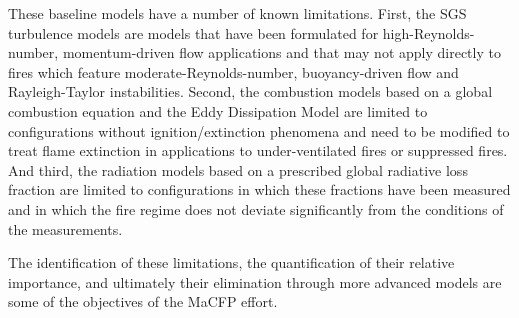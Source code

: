 These baseline models have a number of known limitations. First, the SGS turbulence models are models that have been formulated for high-Reynolds-number, momentum-driven flow applications and that may not apply directly to fires which feature moderate-Reynolds-number, buoyancy-driven flow and Rayleigh-Taylor instabilities. Second, the combustion models based on a global combustion equation and the Eddy Dissipation Model are limited to configurations without ignition/extinction phenomena and need to be modified to treat flame extinction in applications to under-ventilated fires or suppressed fires. And third, the radiation models based on a prescribed global radiative loss fraction are limited to configurations in which these fractions have been measured and in which the fire regime does not deviate significantly from the conditions of the measurements.

The identification of these limitations, the quantification of their relative importance, and ultimately their elimination through more advanced models are some of the objectives of the MaCFP effort.





















